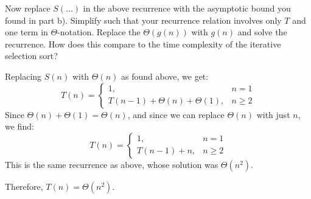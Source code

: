 \begin{prob}
\begin{subprobset}
        \begin{subprob}
            Now replace $S(\ldots)$ in the above recurrence with the asymptotic
            bound you found in part b). Simplify such that your recurrence relation
            involves only $T$ and one term in $\Theta$-notation. Replace
            the $\Theta(g(n))$ with $g(n)$ and solve the recurrence. How
            does this compare to the time complexity of the iterative selection
            sort?

            \begin{soln}
                Replacing $S(n)$ with $\Theta(n)$ as found above, 
                we get:
                \[
                    T(n)
                    =
                    \begin{cases}
                        1,& n = 1\\
                        T(n-1) + \Theta(n) + \Theta(1),& n \geq 2
                    \end{cases}
                \]
                Since $\Theta(n) + \Theta(1) = \Theta(n)$, and since we can
                replace $\Theta(n)$ with just $n$, we find:
                \[
                    T(n)
                    =
                    \begin{cases}
                        1,& n = 1\\
                        T(n-1)  + n,& n \geq 2
                    \end{cases}
                \]
                This is the same recurrence
                as above, whose solution was $\Theta(n^2)$.

                Therefore, $T(n) = \Theta(n^2)$.
            \end{soln}
        \end{subprob}
    \end{subprobset}
\end{prob}
